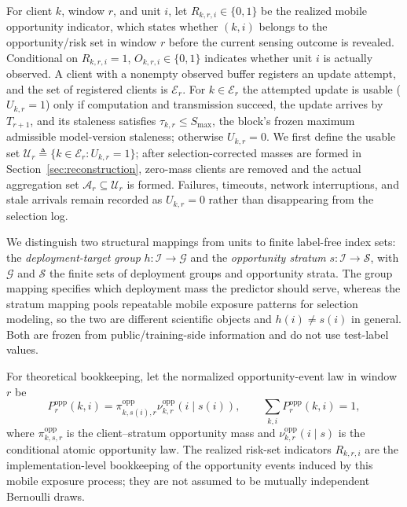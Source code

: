 \documentclass[letterpaper,journal]{IEEEtran}
\begin{document}
For client $k$, window $r$, and unit $i$, let
$R_{k,r,i}\in\{0,1\}$ be the realized mobile opportunity indicator, which states
whether $(k,i)$ belongs to the opportunity/risk set in window $r$ before the
current sensing outcome is revealed.  Conditional on $R_{k,r,i}=1$,
$O_{k,r,i}\in\{0,1\}$ indicates whether unit $i$ is actually observed.  A client
with a nonempty observed buffer registers an update attempt, and the set of
registered clients is $\mathcal{E}_r$.  For $k\in\mathcal{E}_r$ the attempted
update is usable ($U_{k,r}=1$) only if computation and transmission succeed, the
update arrives by $T_{r+1}$, and its staleness satisfies
$\tau_{k,r}\le S_{\max}$, the block's frozen maximum admissible model-version
staleness; otherwise $U_{k,r}=0$.  We first define the usable set
$\mathcal{U}_r\triangleq\{k\in\mathcal{E}_r:U_{k,r}=1\}$; after
selection-corrected masses are formed in Section~\ref{sec:reconstruction},
zero-mass clients are removed and the actual aggregation set
$\mathcal{A}_r\subseteq\mathcal{U}_r$ is formed.  Failures, timeouts, network
interruptions, and stale arrivals remain recorded as $U_{k,r}=0$ rather than
disappearing from the selection log.

We distinguish two structural mappings from units to finite label-free index
sets: the \emph{deployment-target group} $h:\mathcal{I}\to\mathcal{G}$ and the
\emph{opportunity stratum} $s:\mathcal{I}\to\mathcal{S}$, with $\mathcal{G}$ and
$\mathcal{S}$ the finite sets of deployment groups and opportunity strata.  The
group mapping specifies which deployment mass the predictor should serve, whereas
the stratum mapping pools repeatable mobile exposure patterns for selection
modeling, so the two are different scientific objects and $h(i)\neq s(i)$ in
general.  Both are frozen from public/training-side information and do not use
test-label values.

For theoretical bookkeeping, let the normalized opportunity-event law in
window $r$ be
\begin{equation}
 P_r^{\mathrm{opp}}(k,i)
 =
 \pi^{\mathrm{opp}}_{k,s(i),r}
 \nu^{\mathrm{opp}}_{k,r}(i\mid s(i)),
 \qquad
 \sum_{k,i}P_r^{\mathrm{opp}}(k,i)=1,
 \label{eq:opp_event_law}
\end{equation}
where $\pi^{\mathrm{opp}}_{k,s,r}$ is the client--stratum opportunity mass and
$\nu^{\mathrm{opp}}_{k,r}(i\mid s)$ is the conditional atomic opportunity law.
The realized risk-set indicators $R_{k,r,i}$ are the implementation-level
bookkeeping of the opportunity events induced by this mobile exposure process;
they are not assumed to be mutually independent Bernoulli draws.
\end{document}
